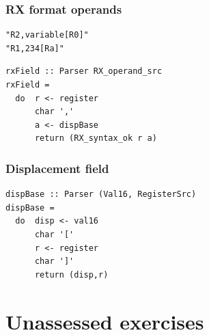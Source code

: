 \documentclass{beamer}
\begin{document}
\begin{frame}[fragile]
\frametitle{RX format operands}

\begin{verbatim}
"R2,variable[R0]"
"R1,234[Ra]"
\end{verbatim}

\begin{verbatim}
rxField :: Parser RX_operand_src
rxField =
  do  r <- register
      char ','
      a <- dispBase
      return (RX_syntax_ok r a)
\end{verbatim}

\end{frame}

\begin{frame}[fragile]
\frametitle{Displacement field}
     
\begin{verbatim}
dispBase :: Parser (Val16, RegisterSrc)
dispBase =
  do  disp <- val16
      char '['
      r <- register
      char ']'
      return (disp,r)
\end{verbatim}

\end{frame}

\section{Unassessed exercises}
\end{document}
